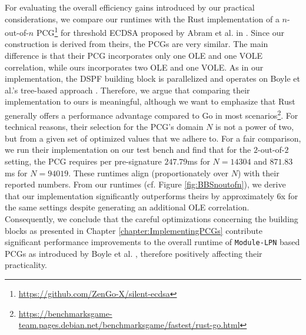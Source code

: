 For evaluating the overall efficiency gains introduced by our practical considerations, we compare our runtimes with the Rust implementation of a $n$-out-of-$n$ PCG\footnote{\url{https://github.com/ZenGo-X/silent-ecdsa}} for threshold ECDSA proposed by Abram et al. in \cite{abram2022low}. Since our construction is derived from theirs, the PCGs are very similar. The main difference is that their PCG incorporates only one OLE and one VOLE correlation, while ours incorporates two OLE and one VOLE. As in our implementation, the DSPF building block is parallelized and operates on Boyle et al.'s tree-based approach \cite{boyle2016function}. Therefore, we argue that comparing their implementation to ours is meaningful, although we want to emphasize that Rust generally offers a performance advantage compared to Go in most scenarios\footnote{\url{https://benchmarksgame-team.pages.debian.net/benchmarksgame/fastest/rust-go.html}}. For technical reasons, their selection for the PCG's domain $N$ is not a power of two, but from a given set of optimized values that we adhere to. For a fair comparison, we run their implementation on our test bench and find that for the $2$-out-of-$2$ setting, the PCG requires per pre-signature $247.79$ms for $N=14304$ and $871.83$ms for $N=94019$. These runtimes align (proportionately over $N$) with their reported numbers. From our runtimes (cf. Figure \ref{fig:BBSnoutofn}), we derive that our implementation significantly outperforms theirs by approximately $6$x for the same settings despite generating an additional OLE correlation. Consequently, we conclude that the careful optimizations concerning the building blocks as presented in Chapter \ref{chapter:ImplementingPCGs} contribute significant performance improvements to the overall runtime of \texttt{Module-LPN} based PCGs as introduced by Boyle et al. \cite{boyle2020efficient}, therefore positively affecting their practicality. 

